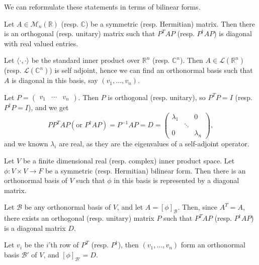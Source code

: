 \documentclass[12pt]{article}
\begin{document}
We can reformulate these statements in terms of bilinear forms.

\begin{corollary}
	Let $A \in \mathcal{M}_n(\mathbb{R})$ (resp. $\mathbb{C}$) be a symmetric (resp. Hermitian) matrix. Then there is an orthogonal (resp. unitary) matrix such that $P^{T}AP$ (resp. $P^{\dagger}AP$) is diagonal with real valued entries.
\end{corollary}

\begin{proofbox}
	Let $\langle \cdot, \cdot \rangle$ be the standard inner product over $\mathbb{R}^{n}$ (resp. $\mathbb{C}^{n}$). Then $A \in \mathcal{L}(\mathbb{R}^{n})$ (resp. $\mathcal{L}(\mathbb{C}^{n})$) is self adjoint, hence we can find an orthonormal basis such that $A$ is diagonal in this basis, say $(v_1, \ldots, v_n)$.

	Let $P =
	\begin{pmatrix}
		v_1 & \cdots & v_n
	\end{pmatrix}
	$. Then $P$ is orthogonal (resp. unitary), so $P^{T}P = I$ (resp. $P^{\dagger}P = I$), and we get
	\[
		PP^{T}AP (\text{or } P^{\dagger}AP) = P^{-1}AP = D =
		\begin{pmatrix}
			\lambda_1 & & 0 \\
				  & \ddots & \\
				 0 & & \lambda_n
		\end{pmatrix}
	,\]
	and we known $\lambda_i$ are real, as they are the eigenvalues of a self-adjoint operator.
\end{proofbox}

\begin{corollary}
	Let $V$ be a finite dimensional real (resp. complex) inner product space. Let $\phi : V \times V \to F$ be a symmetric (resp. Hermitian) bilinear form. Then there is an orthonormal basis of $V$ such that $\phi$ in this basis is represented by a diagonal matrix.
\end{corollary}

\begin{proofbox}
	Let $\mathcal{B}$ be any orthonormal basis of $V$, and let $A = [\phi]_{\mathcal{B}}$. Then, since $A^{T} = A$, there exists an orthogonal (resp. unitary) matrix $P$ such that $P^{T}AP$ (resp. $P^{\dagger}AP$) is a diagonal matrix $D$.

	Let $v_i$ be the $i$'th row of $P^{T}$ (resp. $P^{\dagger}$), then $(v_1, \ldots, v_n)$ form an orthonormal basis $\mathcal{B}'$ of $V$, and $[\phi]_{\mathcal{B}'} = D$.
\end{proofbox}
\end{document}
